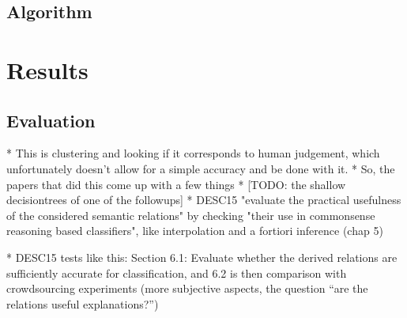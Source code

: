 \documentclass[11pt,
  paper=a4, 
  twoside,  %
  hidelinks,
  bibliography=totocnumbered,
	captions=tableheading,
	BCOR=10mm
]{scrreprt}
\theoremstyle{definition}
\begin{document}
\cite{Molder2021a}





\section{Algorithm}



\chapter{Results}



	
		
	
	
	


\section{Evaluation} %


* This is clustering and looking if it corresponds to human judgement, which unfortunately doesn't allow for a simple accuracy and be done with it.
* So, the papers that did this come up with a few things
* [TODO: the shallow decisiontrees of one of the followups]
* DESC15 "evaluate the practical usefulness of the considered semantic relations" by checking "their use in commonsense reasoning based classifiers", like interpolation and a fortiori inference (chap 5)


* DESC15 tests like this: Section 6.1: Evaluate whether the derived relations are sufficiently accurate for classification, and 6.2 is then comparison with crowdsourcing experiments (more subjective aspects, the question “are the relations useful explanations?”)
\end{document}
